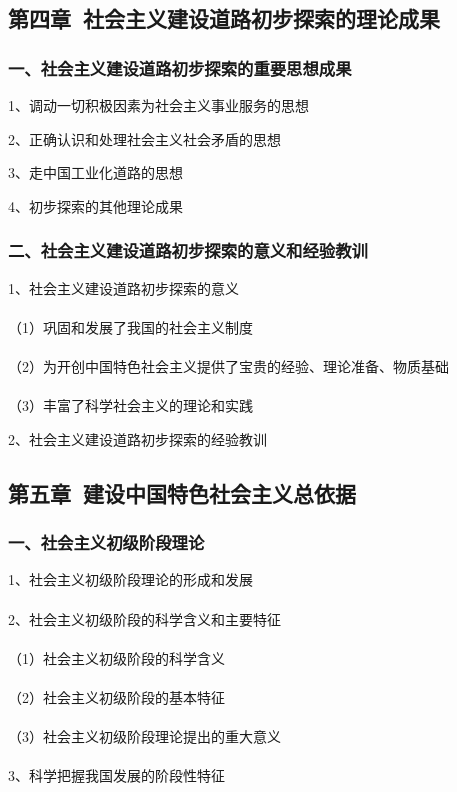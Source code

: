 \documentclass{ctexart}
\begin{document}
\subsection{第四章\ 社会主义建设道路初步探索的理论成果}
\subsubsection{一、社会主义建设道路初步探索的重要思想成果}
1、调动一切积极因素为社会主义事业服务的思想

2、正确认识和处理社会主义社会矛盾的思想

3、走中国工业化道路的思想

4、初步探索的其他理论成果

\subsubsection{二、社会主义建设道路初步探索的意义和经验教训}
1、社会主义建设道路初步探索的意义
\\\\
（1）巩固和发展了我国的社会主义制度
\\\\
（2）为开创中国特色社会主义提供了宝贵的经验、理论准备、物质基础
\\\\
（3）丰富了科学社会主义的理论和实践

2、社会主义建设道路初步探索的经验教训

\subsection{第五章\ 建设中国特色社会主义总依据}
\subsubsection{一、社会主义初级阶段理论}
1、社会主义初级阶段理论的形成和发展
\\\\

2、社会主义初级阶段的科学含义和主要特征
\\\\
（1）社会主义初级阶段的科学含义
\\\\
（2）社会主义初级阶段的基本特征
\\\\
（3）社会主义初级阶段理论提出的重大意义
\\\\

3、科学把握我国发展的阶段性特征
\end{document}
